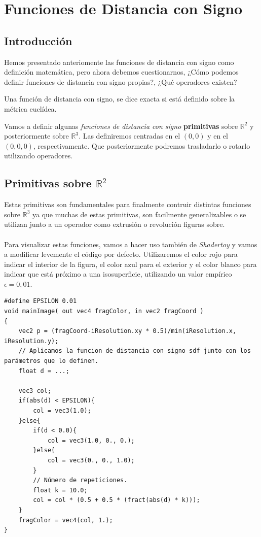 \chapter{Funciones de Distancia con Signo}
\section{Introducción}
Hemos presentado anteriomente las funciones de distancia con signo como definición matemática, pero ahora debemos cuestionarnos, ¿Cómo podemos definir funciones de distancia con signo propias?, ¿Qué operadores existen?

\begin{definition}
Una función de distancia con signo, se dice exacta si está definido sobre la métrica euclídea.
\end{definition}

Vamos a definir algunas \textit{funciones de distancia con signo} \textbf{primitivas} sobre \(\mathbb{R}^2\) y posteriormente sobre \(\mathbb{R}^3\). Las definiremos centradas en el \((0,0)\) y en el \((0,0,0)\), respectivamente. Que posteriormente podremos trasladarlo o rotarlo utilizando operadores.
\section{Primitivas sobre \(\mathbb{R}^2\)}
Estas primitivas son fundamentales para finalmente contruir distintas funciones sobre \(\mathbb{R}^3\) ya que muchas de estas primitivas, son facilmente generalizables o se utilizan junto a un operador como extrusión o revolución figuras sobre.\\\\
Para visualizar estas funciones, vamos a hacer uso también de \textit{Shadertoy} y vamos a modificar levemente el código por defecto. Utilizaremos el color rojo para indicar el interior de la figura, el color azul para el exterior y el color blanco para indicar que está próximo a una isosuperficie, utilizando un valor empírico \(\epsilon=0,01\).
\begin{lstlisting}
#define EPSILON 0.01
void mainImage( out vec4 fragColor, in vec2 fragCoord )
{
    vec2 p = (fragCoord-iResolution.xy * 0.5)/min(iResolution.x, iResolution.y);
    // Aplicamos la funcion de distancia con signo sdf junto con los parámetros que lo definen.
    float d = ...;
    
    vec3 col;
    if(abs(d) < EPSILON){
        col = vec3(1.0);
    }else{
        if(d < 0.0){
    		col = vec3(1.0, 0., 0.);
    	}else{
    		col = vec3(0., 0., 1.0);
    	}
    	// Número de repeticiones.
        float k = 10.0;
        col = col * (0.5 + 0.5 * (fract(abs(d) * k)));
    }
    fragColor = vec4(col, 1.);
}
\end{lstlisting}

